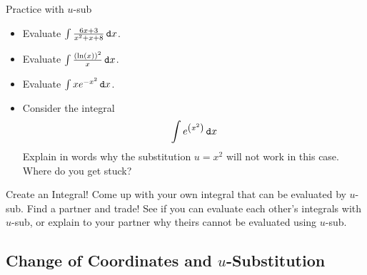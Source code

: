 \begin{exercise}{Practice with $u$-sub \Coffeecup \Coffeecup}
\begin{itemize}
\item Evaluate $\int \frac{6x+3}{x^2+x+8} \mathop{}\!\mathtt{d} x$.
\item Evaluate $\int \frac{\left(\ln(x)\right)^2}{x} \mathop{}\!\mathtt{d} x$.
\item Evaluate $\int x e^{-x^2} \mathop{}\!\mathtt{d} x$.
\item Consider the integral  $$\int  e^{\left(x^2\right)} \mathop{}\!\mathtt{d} x$$ Explain in words why the substitution $u=x^2$ will not work in this case.  Where do you get stuck? 
\end{itemize}
\end{exercise}

\begin{exercise}{Create an Integral! \Coffeecup \Coffeecup \Coffeecup}
 Come up with your own integral that can be evaluated by $u$-sub.  Find a partner and trade!  See if you can evaluate each other's integrals with $u$-sub, or explain to your partner why theirs cannot be evaluated using $u$-sub.

\vspace{2in}
\end{exercise}

\subsection{Change of Coordinates and $u$-Substitution}

